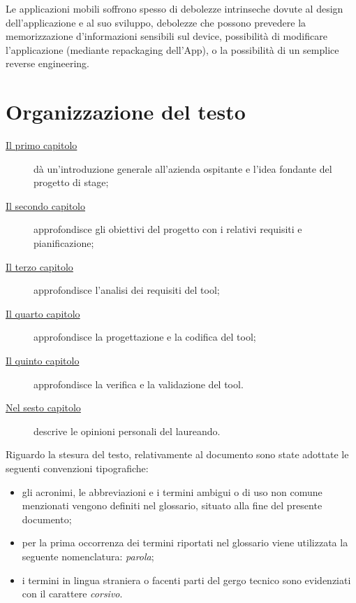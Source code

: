 Le applicazioni mobili soffrono spesso di debolezze intrinseche dovute al design dell'applicazione e al suo sviluppo, debolezze che possono prevedere la memorizzazione d'informazioni sensibili sul device, possibilità di modificare l'applicazione (mediante repackaging dell'App), o la possibilità di un semplice reverse engineering.

\section{Organizzazione del testo}\label{sec:organizzazione-del-testo}

\begin{description}
    \item[{\hyperref[ch:introduzione]{Il primo capitolo}}] dà un'introduzione generale all'azienda ospitante e l'idea fondante del progetto di stage;

    \item[{\hyperref[ch:descrizione-stage]{Il secondo capitolo}}] approfondisce gli obiettivi del progetto con i relativi requisiti e pianificazione;

    \item[{\hyperref[ch:analisi-requisiti]{Il terzo capitolo}}] approfondisce l'analisi dei requisiti del tool;

    \item[{\hyperref[cap:progettazione-codifica]{Il quarto capitolo}}] approfondisce la progettazione e la codifica del tool;
    
    \item[{\hyperref[cap:verifica-validazione]{Il quinto capitolo}}] approfondisce la verifica e la validazione del tool.
    
    \item[{\hyperref[cap:conclusioni]{Nel sesto capitolo}}] descrive le opinioni personali del laureando.
\end{description}

Riguardo la stesura del testo, relativamente al documento sono state adottate le seguenti convenzioni tipografiche:
\begin{itemize}
	\item gli acronimi, le abbreviazioni e i termini ambigui o di uso non comune menzionati vengono definiti nel glossario, situato alla fine del presente documento;
	\item per la prima occorrenza dei termini riportati nel glossario viene utilizzata la seguente nomenclatura: \emph{parola}\glsfirstoccur;
	\item i termini in lingua straniera o facenti parti del gergo tecnico sono evidenziati con il carattere \emph{corsivo}.
\end{itemize}